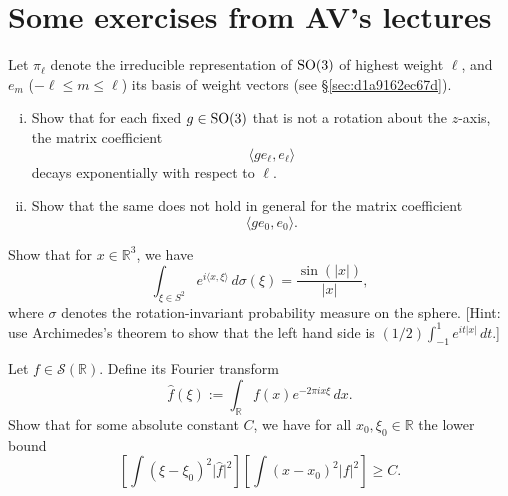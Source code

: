 \documentclass[reqno]{amsart} 
\numberwithin{equation}{section}
\begin{document}
\section{Some exercises from AV's lectures}

\begin{exercise}
  Let $\pi_{\ell}$ denote the irreducible representation of $\operatorname{SO}(3)$ of highest weight $\ell$, and $e_m$ ($-\ell \leq m \leq \ell$) its basis of weight vectors (see \S\ref{sec:d1a9162ec67d}).
  \begin{enumerate}[(i)]
  \item Show that for each fixed $g \in \operatorname{SO}(3)$ that is not a rotation about the $z$-axis, the matrix coefficient
    \begin{equation*}
      \langle g e_{\ell}, e_{\ell}  \rangle
    \end{equation*}
    decays exponentially with respect to $\ell$.
  \item Show that the same does not hold in general for the matrix coefficient
    \begin{equation*}
      \langle g e_0, e_0 \rangle.
    \end{equation*}
  \end{enumerate}
\end{exercise}

\begin{exercise}
  Show that for $x \in \mathbb{R}^3$, we have
  \begin{equation*}
    \int_{\xi \in S^2}
    e^{i \langle x, \xi  \rangle}
    \, d \sigma(\xi)
    =
    \frac{\sin(\lvert x \rvert)}{\lvert x \rvert},
  \end{equation*}
  where $\sigma$ denotes the rotation-invariant probability measure on the sphere.  [Hint: use Archimedes's theorem to show that the left hand side is $(1/2) \int_{-1}^1 e^{i t |x|} \, d t$.]
\end{exercise}

\begin{exercise}
  Let $f \in \mathcal{S}(\mathbb{R})$.  Define its Fourier transform
  \begin{equation*}
    \hat{f}(\xi) := \int_{\mathbb{R}} f(x) e^{-2 \pi i x \xi} \, d x.
  \end{equation*}
  Show that for some absolute constant $C$, we have for all $x_0,\xi_0 \in \mathbb{R}$ the lower bound
  \begin{equation*}
    \left[
      \int \left( \xi  - \xi_0  \right)^2 \lvert \hat{f} \rvert^2 
    \right]
    \left[ \int \left( x - x_0  \right)^2 \lvert f \rvert^2  \right]
    \geq C.
  \end{equation*}
\end{exercise}
\end{document}
